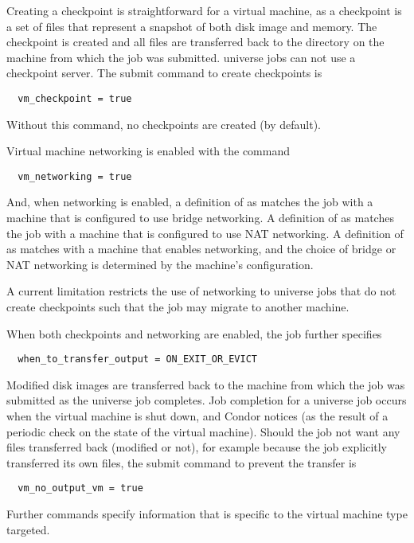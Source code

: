 Creating a checkpoint is straightforward for a virtual machine,
as a checkpoint is a set of files that represent
a snapshot of both disk image and memory.
The checkpoint is created and all files are transferred back
to the  directory on the machine from which
the job was submitted.
 universe jobs can not use a checkpoint server.
The submit command to create checkpoints is
\begin{verbatim}
  vm_checkpoint = true
\end{verbatim}
Without this command, no checkpoints are created (by default).

Virtual machine networking is enabled with the command
\begin{verbatim}
  vm_networking = true
\end{verbatim}
And, when networking is enabled, a definition of
 as 
matches the job with a machine that is configured to use
bridge networking.
A definition of
 as 
matches the job with a machine that is configured to use
NAT networking.
A definition of
 as 
matches with a machine
that enables networking, and the choice of bridge or NAT networking
is determined by the machine's configuration.

A current limitation restricts the use of networking to
 universe jobs that do not create checkpoints
such that the job may migrate to another machine.

When both checkpoints and networking are enabled,
the job further specifies
\begin{verbatim}
  when_to_transfer_output = ON_EXIT_OR_EVICT
\end{verbatim}

Modified disk images are transferred back to the machine from which
the job was submitted as the  universe job completes.
Job completion for a  universe job occurs when 
the virtual machine is shut down, and Condor notices 
(as the result of a periodic check on the state of the virtual machine).
Should the job not want any files transferred back (modified or not),
for example because the job explicitly transferred its own files,
the submit command to prevent the transfer is
\begin{verbatim}
  vm_no_output_vm = true
\end{verbatim}

Further commands specify information that is specific to the
virtual machine type targeted.

